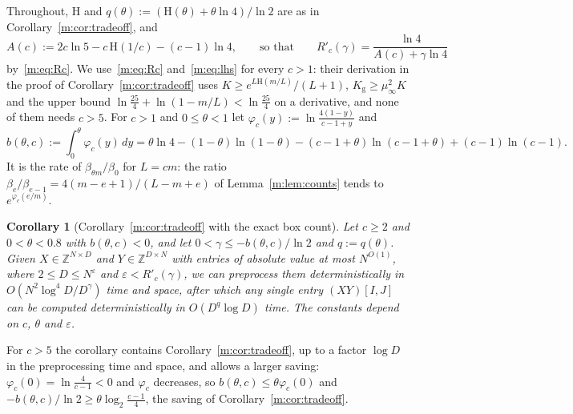 \documentclass[11pt]{article}
\newtheorem{corollary}[theorem]{Corollary}
\theoremstyle{definition}
\theoremstyle{remark}
\newcommand{\Z}{\mathbb{Z}}
\newcommand{\Hh}{\mathrm{H}}
\newcommand{\Kg}{K_{\mathrm g}}
\begin{document}
Throughout, $\Hh$ and $q(\theta):=(\Hh(\theta)+\theta\ln4)/\ln2$ are as in Corollary~\ref{m:cor:tradeoff}, and
\[
A(c):=2c\ln5-c\,\Hh(1/c)-(c-1)\ln4,\qquad\text{so that}\qquad R'_c(\gamma)=\frac{\ln4}{A(c)+\gamma\ln4}
\]
by~\eqref{m:eq:Rc}. We use~\eqref{m:eq:Rc} and~\eqref{m:eq:lhs} for every $c>1$: their derivation in the proof of Corollary~\ref{m:cor:tradeoff} uses $K\ge e^{L\Hh(m/L)}/(L+1)$, $\Kg\ge\mu_\infty^2K$ and the upper bound $\ln\frac{25}4+\ln(1-m/L)<\ln\frac{25}4$ on a derivative, and none of them needs $c>5$. For $c>1$ and $0\le\theta<1$ let $\varphi_c(y):=\ln\frac{4(1-y)}{c-1+y}$ and
\[
b(\theta,c):=\int_0^\theta\varphi_c(y)\,dy=\theta\ln4-(1-\theta)\ln(1-\theta)-(c-1+\theta)\ln(c-1+\theta)+(c-1)\ln(c-1).
\]
It is the rate of $\beta_{\theta m}/\beta_0$ for $L=cm$: the ratio $\beta_e/\beta_{e-1}=4(m-e+1)/(L-m+e)$ of Lemma~\ref{m:lem:counts} tends to $e^{\varphi_c(e/m)}$.

\begin{corollary}[Corollary~\ref{m:cor:tradeoff} with the exact box count]\label{m:cor:exactboxes}
Let $c\ge2$ and $0<\theta<0.8$ with $b(\theta,c)<0$,
and let $0<\gamma\le-b(\theta,c)/\ln2$ and $q:=q(\theta)$. Given $X\in\Z^{N\times D}$ and $Y\in\Z^{D\times N}$ with entries of absolute value at most $N^{O(1)}$, where $2\le D\le N^\varepsilon$ and $\varepsilon<R'_c(\gamma)$, we can preprocess them deterministically in $O(N^2\log^4\!D/D^\gamma)$ time and space, after which any single entry $(XY)[I,J]$ can be computed deterministically in $O(D^q\log D)$ time. The constants depend on $c$, $\theta$ and $\varepsilon$.
\end{corollary}

For $c>5$ the corollary contains Corollary~\ref{m:cor:tradeoff}, up to a factor $\log D$ in the preprocessing time and space, and allows a larger saving: $\varphi_c(0)=\ln\frac4{c-1}<0$ and $\varphi_c$ decreases, so $b(\theta,c)\le\theta\varphi_c(0)$ and $-b(\theta,c)/\ln2\ge\theta\log_2\frac{c-1}4$, the saving of Corollary~\ref{m:cor:tradeoff}.
\end{document}
